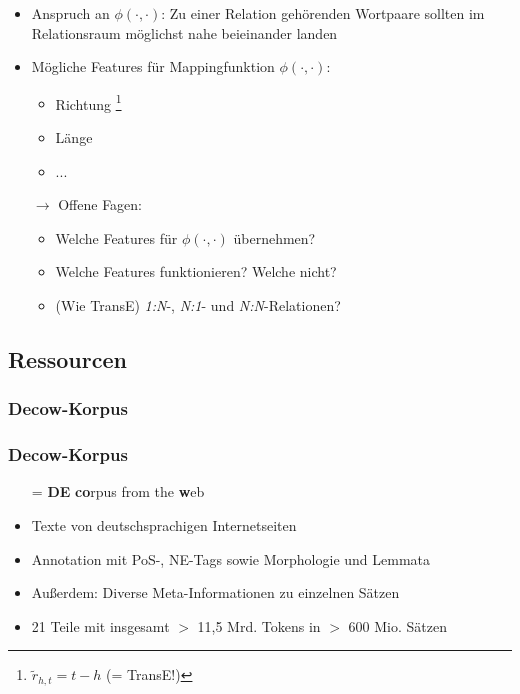 \documentclass[10pt,xcolor={usenames,dvipsnames,svgnames,table}]{beamer}
\begin{document}
\begin{frame}
	\begin{itemize}
		\item Anspruch an $\phi(\cdot, \cdot)$: Zu einer Relation gehörenden Wortpaare sollten im Relationsraum möglichst nahe beieinander landen
		\item Mögliche Features für Mappingfunktion $\phi(\cdot, \cdot)$:
		\begin{itemize}
			\item Richtung \footnote{$\tilde{r}_{h, t} = t - h$ (= TransE!)}
			\item Länge
			\item ...
		\end{itemize}
		\item[$\rightarrow$] Offene Fagen:
		\begin{itemize}
			\item Welche Features für $\phi(\cdot, \cdot)$ übernehmen?
			\item Welche Features funktionieren? Welche nicht?
			\item (Wie TransE) \emph{1:N}-, \emph{N:1}- und \emph{N:N}-Relationen?
		\end{itemize}
	\end{itemize}
\end{frame}


	\begin{frame}
		\subsection{Ressourcen}
		\subsubsection{Decow-Korpus}
		\frametitle{Decow-Korpus}
		\begin{itemize}
			\item[=] \textbf{DE} \textbf{co}rpus from the \textbf{w}eb  
			\item Texte von deutschsprachigen Internetseiten
			\item Annotation mit PoS-, NE-Tags sowie Morphologie und Lemmata
			\item Außerdem: Diverse Meta-Informationen zu einzelnen Sätzen
			\item 21 Teile mit insgesamt $>$ 11,5 Mrd. Tokens in $>$ 600 Mio. Sätzen
		\end{itemize}
	\end{frame}
\end{document}
